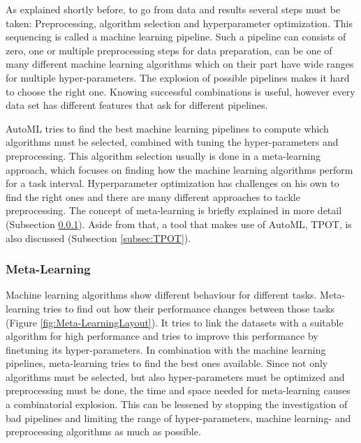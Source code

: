 \documentclass[10pt,a4paper]{article}
\begin{document}
	As explained shortly before, to go from data and results several steps must be taken: Preprocessing, algorithm selection and hyperparameter optimization. This sequencing is called a machine learning pipeline. Such a pipeline can consists of zero, one or multiple preprocessing steps for data preparation, can be one of many different machine learning algorithms which on their part have wide ranges for multiple hyper-parameters. The explosion of possible pipelines makes it hard to choose the right one. Knowing successful combinations is useful, however every data set has different features that ask for different pipelines\cite{Gijsbers2017Thesis}.
	
	AutoML tries to find the best machine learning pipelines to compute which algorithms must be selected, combined with tuning the hyper-parameters and preprocessing. This algorithm selection usually is done in a meta-learning approach, which focuses on finding how the machine learning algorithms perform for a task interval. Hyperparameter optimization has challenges on his own to find the right ones and there are many different approaches to tackle preprocessing. The concept of meta-learning is briefly explained in more detail (Subsection \ref{subsec:Meta-Learning}). Aside from that, a tool that makes use of AutoML, TPOT, is also discussed (Subsection \ref{subsec:TPOT}). 	
	
	
	\subsubsection{Meta-Learning}
	\label{subsec:Meta-Learning}
	
Machine learning algorithms show different behaviour for different tasks. Meta-learning tries to find out how their performance changes between those tasks (Figure \ref{fig:Meta-LearningLayout}). It tries to link the datasets with a suitable algorithm for high performance and tries to improve this performance by finetuning its hyper-parameters. In combination with the machine learning pipelines, meta-learning tries to find the best ones available. Since not only algorithms must be selected, but also hyper-parameters must be optimized and preprocessing must be done, the time and space needed for meta-learning causes a combinatorial explosion. This can be lessened by stopping the investigation of bad pipelines and limiting the range of hyper-parameters, machine learning- and preprocessing algorithms as much as possible. 
\end{document}
